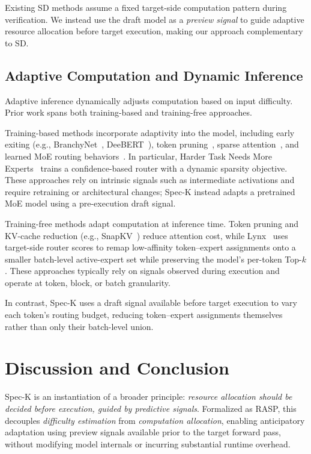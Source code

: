 \documentclass[conference]{IEEEtran}
\theoremstyle{definition} %
\begin{document}
Existing SD methods assume a fixed target-side computation pattern during verification. 
We instead use the draft model as a \emph{preview signal} to guide adaptive resource allocation before target execution, making our approach complementary to SD.

\subsection{Adaptive Computation and Dynamic Inference}

Adaptive inference dynamically adjusts computation based on input difficulty. 
Prior work spans both training-based and training-free approaches.

Training-based methods incorporate adaptivity into the model, including early exiting (e.g., BranchyNet~\cite{teerapittayanon2016branchynet}, DeeBERT~\cite{xin2020deebert}), token pruning~\cite{rao2021dynamicvit}, sparse attention~\cite{yuan2025native}, and learned MoE routing behaviors~\cite{zhou2022mixture,huang2024harder,jin2024moe++}. 
In particular, Harder Task Needs More Experts~\cite{huang2024harder} trains a confidence-based router with a dynamic sparsity objective.
These approaches rely on intrinsic signals such as intermediate activations and require retraining or architectural changes; Spec-K instead adapts a pretrained MoE model using a pre-execution draft signal.

Training-free methods adapt computation at inference time. 
Token pruning and KV-cache reduction (e.g., SnapKV~\cite{li2024snapkv}) reduce attention cost, while Lynx~\cite{gupta2024lynx} uses target-side router scores to remap low-affinity token--expert assignments onto a smaller batch-level active-expert set while preserving the model's per-token Top-$k$.
These approaches typically rely on signals observed during execution and operate at token, block, or batch granularity.

In contrast, Spec-K uses a draft signal available before target execution to vary each token's routing budget, reducing token--expert assignments themselves rather than only their batch-level union.

\section{Discussion and Conclusion}

Spec-K is an instantiation of a broader principle: \emph{resource allocation should be decided before execution, guided by predictive signals}. Formalized as RASP, this decouples \emph{difficulty estimation} from \emph{computation allocation}, enabling anticipatory adaptation using preview signals available prior to the target forward pass, without modifying model internals or incurring substantial runtime overhead.
\end{document}

